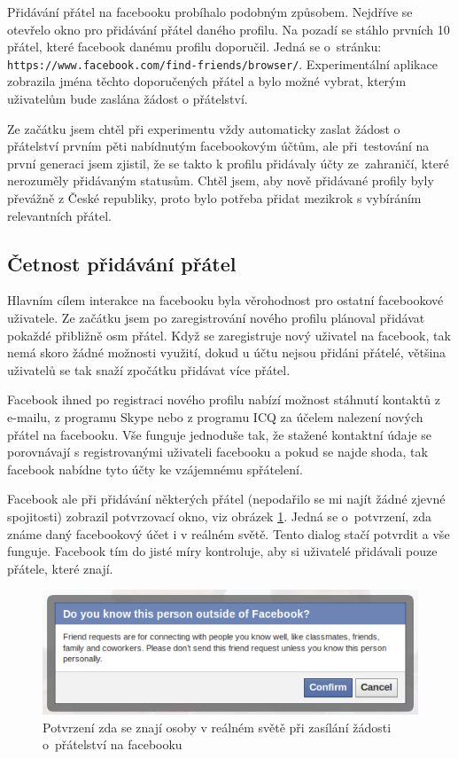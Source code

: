 \documentclass[thesis=M,czech]{FITthesis}[2013/05/10]
\begin{document}
Přidávání přátel na facebooku probíhalo podobným způsobem. Nejdříve se otevřelo okno pro přidávání přátel daného profilu. Na pozadí se stáhlo prvních 10 přátel, které facebook danému profilu doporučil. Jedná se o~stránku: \verb|https://www.facebook.com/find-friends/browser/|. Experimentální aplikace zobrazila jména těchto doporučených přátel a bylo možné vybrat, kterým uživatelům bude zaslána žádost o přátelství. 

Ze začátku jsem chtěl při experimentu vždy automaticky zaslat žádost o přátelství prvním pěti nabídnutým facebookovým účtům, ale při~testování na první generaci jsem zjistil, že se takto k profilu přidávaly účty ze~zahraničí, které nerozuměly přidávaným statusům. Chtěl jsem, aby nově přidávané profily byly převážně z České republiky, proto bylo potřeba přidat mezikrok s vybíráním relevantních přátel.

\subsection{Četnost přidávání přátel}

Hlavním cílem interakce na facebooku byla věrohodnost pro ostatní facebookové uživatele. Ze začátku jsem po zaregistrování nového profilu plánoval přidávat pokaždé přibližně osm přátel. Když se zaregistruje nový uživatel na facebook, tak nemá skoro žádné možnosti využití, dokud u účtu nejsou přidáni přátelé, většina uživatelů se tak snaží zpočátku přidávat více přátel. 

Facebook ihned po registraci nového profilu nabízí možnost stáhnutí kontaktů z e-mailu, z programu Skype nebo z programu ICQ za účelem nalezení nových přátel na facebooku. Vše funguje jednoduše tak, že stažené kontaktní údaje se porovnávají s registrovanými uživateli facebooku a pokud se najde shoda, tak facebook nabídne tyto účty ke vzájemnému spřátelení.

Facebook ale při přidávání některých přátel (nepodařilo se mi najít žádné zjevné spojitosti) zobrazil potvrzovací okno, viz obrázek \ref{fig:confirmFriendship}. Jedná se o~potvrzení, zda známe daný facebookový účet i v reálném světě. Tento dialog stačí potvrdit a vše funguje. Facebook tím do jisté míry kontroluje, aby si uživatelé přidávali pouze přátele, které znají.

\begin{figure}[h]
\begin{center}
\includegraphics[width=5in]{figures/confirm-friendship.png}
\caption{Potvrzení zda se znají osoby v reálném světě při zasílání žádosti o~přátelství na facebooku}
\label{fig:confirmFriendship}
\end{center}
\end{figure}
\end{document}
